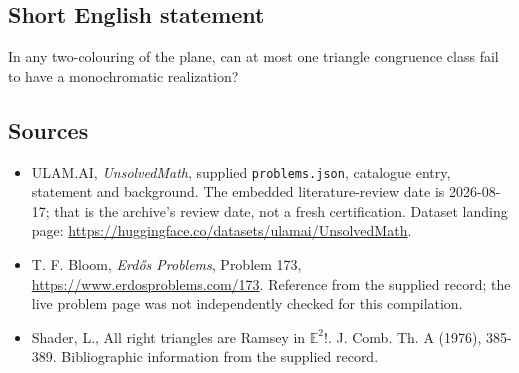 \documentclass[11pt,a4paper]{article}
\begin{document}
\subsection{Short English statement}

In any two-colouring of the plane, can at most one triangle congruence class fail to have a monochromatic realization?

\subsection{Sources}

{\small

\begin{itemize}

\item[\hypertarget{source:statement:1}{S1}] ULAM.AI, \emph{UnsolvedMath}, supplied \texttt{problems.json}, catalogue entry, statement and background. The embedded literature-review date is 2026-08-17; that is the archive’s review date, not a fresh certification. Dataset landing page: \url{https://huggingface.co/datasets/ulamai/UnsolvedMath}.

\item[\hypertarget{source:statement:2}{S2}] T. F. Bloom, \emph{Erdős Problems}, Problem 173, \url{https://www.erdosproblems.com/173}. Reference from the supplied record; the live problem page was not independently checked for this compilation.

\item[\hypertarget{source:statement:3}{S3}] Shader, L., All right triangles are Ramsey in $\mathbb{E}^2$!. J. Comb. Th. A (1976), 385-389. Bibliographic information from the supplied record.

\end{itemize}

}

\label{end:statement}
\end{document}
